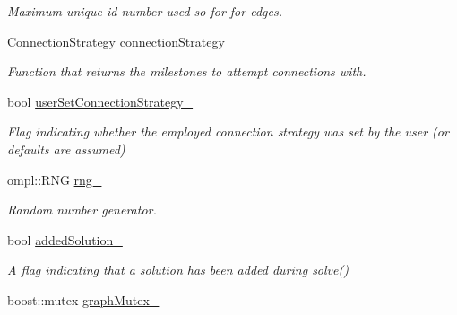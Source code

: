 \begin{DoxyCompactItemize}
\begin{DoxyCompactList}\small\item\em \-Maximum unique id number used so for for edges. \end{DoxyCompactList}\item 
\hypertarget{class_f_i_r_m_a0fcb0aef9c9101c4569f5b6bb5f576ae}{\hyperlink{class_f_i_r_m_a15cfbcaf52c0bdd5e6c1a969bbf7ea1e}{\-Connection\-Strategy} \hyperlink{class_f_i_r_m_a0fcb0aef9c9101c4569f5b6bb5f576ae}{connection\-Strategy\-\_\-}}\label{class_f_i_r_m_a0fcb0aef9c9101c4569f5b6bb5f576ae}

\begin{DoxyCompactList}\small\item\em \-Function that returns the milestones to attempt connections with. \end{DoxyCompactList}\item 
\hypertarget{class_f_i_r_m_a42cc77417338d946478f5a71e6bd5b70}{bool \hyperlink{class_f_i_r_m_a42cc77417338d946478f5a71e6bd5b70}{user\-Set\-Connection\-Strategy\-\_\-}}\label{class_f_i_r_m_a42cc77417338d946478f5a71e6bd5b70}

\begin{DoxyCompactList}\small\item\em \-Flag indicating whether the employed connection strategy was set by the user (or defaults are assumed) \end{DoxyCompactList}\item 
\hypertarget{class_f_i_r_m_a2e91a5d8aba0ccaca892fb9eeda4ef41}{ompl\-::\-R\-N\-G \hyperlink{class_f_i_r_m_a2e91a5d8aba0ccaca892fb9eeda4ef41}{rng\-\_\-}}\label{class_f_i_r_m_a2e91a5d8aba0ccaca892fb9eeda4ef41}

\begin{DoxyCompactList}\small\item\em \-Random number generator. \end{DoxyCompactList}\item 
\hypertarget{class_f_i_r_m_afc413ddef9b66cd337c0e19c6ba79d84}{bool \hyperlink{class_f_i_r_m_afc413ddef9b66cd337c0e19c6ba79d84}{added\-Solution\-\_\-}}\label{class_f_i_r_m_afc413ddef9b66cd337c0e19c6ba79d84}

\begin{DoxyCompactList}\small\item\em \-A flag indicating that a solution has been added during solve() \end{DoxyCompactList}\item 
\hypertarget{class_f_i_r_m_ae71c316b447bb7b404dc27c8d673fd55}{boost\-::mutex \hyperlink{class_f_i_r_m_ae71c316b447bb7b404dc27c8d673fd55}{graph\-Mutex\-\_\-}}\label{class_f_i_r_m_ae71c316b447bb7b404dc27c8d673fd55}


\end{DoxyCompactItemize}
